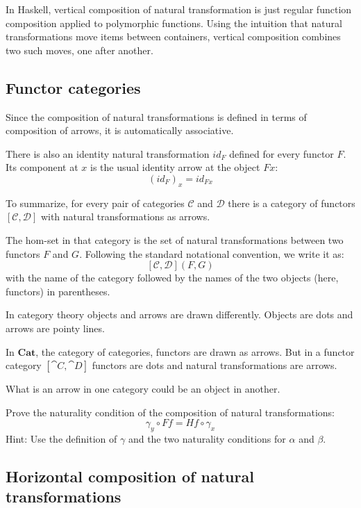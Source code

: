 \documentclass[DaoFP]{subfiles}
\begin{document}
In Haskell, vertical composition of natural transformation is just regular function composition applied to polymorphic functions. Using the intuition that natural transformations move items between containers, vertical composition combines two such moves, one after another.

\subsection{Functor categories}

Since the composition of natural transformations is defined in terms of composition of arrows, it is automatically associative. 

There is also an identity natural transformation $id_F$ defined for every functor $F$. Its component at $x$ is the usual identity arrow at the object $F x$:
\[ (id_F)_x = id_{F x} \]

To summarize, for every pair of categories $\mathcal{C}$ and $\mathcal{D}$ there is a category of functors $[\mathcal{C}, \mathcal{D}]$ with natural transformations as arrows. 

The hom-set in that category is the set of natural transformations between two functors $F$ and $G$. Following the standard notational convention, we write it as:
\[ [\mathcal{C}, \mathcal{D}](F, G) \]
with the name of the category followed by the names of the two objects (here, functors) in parentheses.

In category theory objects and arrows are drawn differently. Objects are dots and arrows are pointy lines.

In $\mathbf{Cat}$, the category of categories, functors are drawn as arrows. But in a functor category $[\cat C, \cat D]$ functors are dots and natural transformations are arrows.

What is an arrow in one category could be an object in another.


\begin{exercise}
Prove the naturality condition of the composition of natural transformations:
\[ \gamma_y \circ F f = H f \circ \gamma_x \]
Hint: Use the definition of $\gamma$ and the two naturality conditions for $\alpha$ and $\beta$.
\end{exercise}


\subsection{Horizontal composition of natural transformations}
\end{document}
